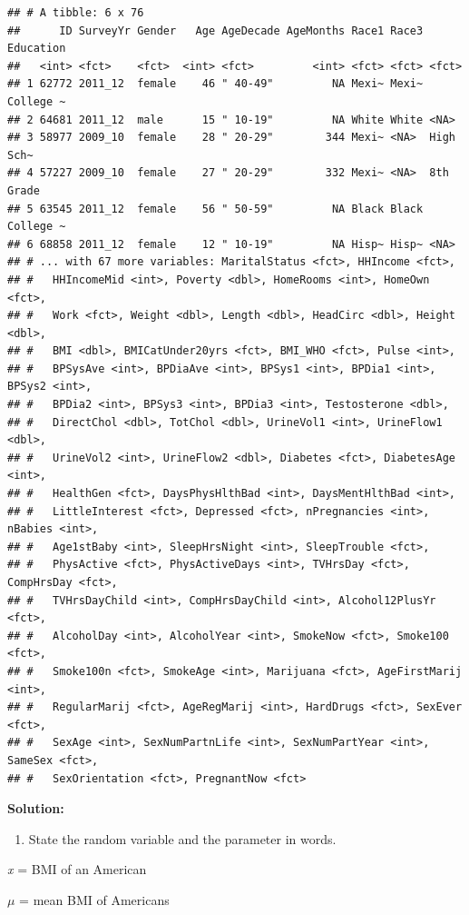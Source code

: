 \documentclass[
]{book}
\providecommand{\tightlist}{%
  \setlength{\itemsep}{0pt}\setlength{\parskip}{0pt}}
\begin{document}
\begin{verbatim}
## # A tibble: 6 x 76
##      ID SurveyYr Gender   Age AgeDecade AgeMonths Race1 Race3 Education
##   <int> <fct>    <fct>  <int> <fct>         <int> <fct> <fct> <fct>    
## 1 62772 2011_12  female    46 " 40-49"         NA Mexi~ Mexi~ College ~
## 2 64681 2011_12  male      15 " 10-19"         NA White White <NA>     
## 3 58977 2009_10  female    28 " 20-29"        344 Mexi~ <NA>  High Sch~
## 4 57227 2009_10  female    27 " 20-29"        332 Mexi~ <NA>  8th Grade
## 5 63545 2011_12  female    56 " 50-59"         NA Black Black College ~
## 6 68858 2011_12  female    12 " 10-19"         NA Hisp~ Hisp~ <NA>     
## # ... with 67 more variables: MaritalStatus <fct>, HHIncome <fct>,
## #   HHIncomeMid <int>, Poverty <dbl>, HomeRooms <int>, HomeOwn <fct>,
## #   Work <fct>, Weight <dbl>, Length <dbl>, HeadCirc <dbl>, Height <dbl>,
## #   BMI <dbl>, BMICatUnder20yrs <fct>, BMI_WHO <fct>, Pulse <int>,
## #   BPSysAve <int>, BPDiaAve <int>, BPSys1 <int>, BPDia1 <int>, BPSys2 <int>,
## #   BPDia2 <int>, BPSys3 <int>, BPDia3 <int>, Testosterone <dbl>,
## #   DirectChol <dbl>, TotChol <dbl>, UrineVol1 <int>, UrineFlow1 <dbl>,
## #   UrineVol2 <int>, UrineFlow2 <dbl>, Diabetes <fct>, DiabetesAge <int>,
## #   HealthGen <fct>, DaysPhysHlthBad <int>, DaysMentHlthBad <int>,
## #   LittleInterest <fct>, Depressed <fct>, nPregnancies <int>, nBabies <int>,
## #   Age1stBaby <int>, SleepHrsNight <int>, SleepTrouble <fct>,
## #   PhysActive <fct>, PhysActiveDays <int>, TVHrsDay <fct>, CompHrsDay <fct>,
## #   TVHrsDayChild <int>, CompHrsDayChild <int>, Alcohol12PlusYr <fct>,
## #   AlcoholDay <int>, AlcoholYear <int>, SmokeNow <fct>, Smoke100 <fct>,
## #   Smoke100n <fct>, SmokeAge <int>, Marijuana <fct>, AgeFirstMarij <int>,
## #   RegularMarij <fct>, AgeRegMarij <int>, HardDrugs <fct>, SexEver <fct>,
## #   SexAge <int>, SexNumPartnLife <int>, SexNumPartYear <int>, SameSex <fct>,
## #   SexOrientation <fct>, PregnantNow <fct>
\end{verbatim}

\textbf{Solution:}

\begin{enumerate}
\def\labelenumi{\arabic{enumi}.}
\tightlist
\item
  State the random variable and the parameter in words.
\end{enumerate}

\emph{x} = BMI of an American

\(\mu\) = mean BMI of Americans
\end{document}

